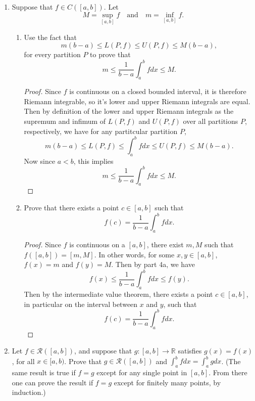 \documentclass[12pt]{article}
\newcommand{\R}{\mathbb{R}}
\newcommand{\RR}{\mathcal{R}}
\newcommand{\isp}[1]{\quad\text{#1}\quad}
\begin{document}
\begin{enumerate}
\begin{enumerate}
\begin{proof}
\end{proof}

\end{enumerate}

\item
Suppose that $f\in C([a,b])$.  Let 
\[M=\sup\limits_{[a,b]}f\isp{and} m=\inf\limits_{[a,b]}f.\]

\begin{enumerate}

\item
Use the fact that
\[m(b-a)\le L(P,f)\le U(P,f)\le M(b-a),\]
for every partition $P$ to prove that
\[m\le \frac1{b-a}\int_a^bfdx\le M.\]

\begin{proof}
    Since $f$ is continuous on a closed bounded interval, it is therefore Riemann integrable, so it's lower and upper Riemann integrals are equal. Then by definition of the lower and upper Riemann integrals as the supremum and infimum of $L(P,f)$ and $U(P,f)$ over all partitions $P$, respectively, we have for any partitcular partition $P$,
    \[m(b-a)\le L(P,f) \le \int_a^bfdx \le U(P,f)\le M(b-a).\]
    Now since $a<b$, this implies
    \[m\le \frac1{b-a}\int_a^bfdx\le M.\]
    
\end{proof}

\item
Prove that there exists a point $c\in[a,b]$ such that
\[f(c)=\frac1{b-a}\int_a^bfdx.\]

\begin{proof}
    Since $f$ is continuous on a $[a,b]$, there exist $m,M$ such that $f([a,b])=[m,M]$. In other words, for some $x,y\in[a,b]$, $f(x)=m$ and $f(y)=M$. Then by part 4a, we have
    \[f(x)\le \frac1{b-a}\int_a^bfdx\le f(y).\]
    Then by the intermediate value theorem, there exists a point $c\in[a,b]$, in particular on the interval between $x$ and $y$, such that
    \[f(c) = \frac1{b-a}\int_a^bfdx.\]
    
\end{proof}

\end{enumerate}

\newpage
\item
Let $f\in\RR([a,b])$, and suppose that  $g:[a,b]\to\R$ satisfies $g(x)=f(x)$, for
all $x\in[a,b)$.  Prove that $g\in\RR([a,b])$ and
$\int_a^bfdx=\int_a^bgdx$.
(The same result is true if $f=g$ except for any single point in $[a,b]$.
From there one can prove the result if $f=g$ except for finitely many points, by induction.)


\end{enumerate}
\end{document}
